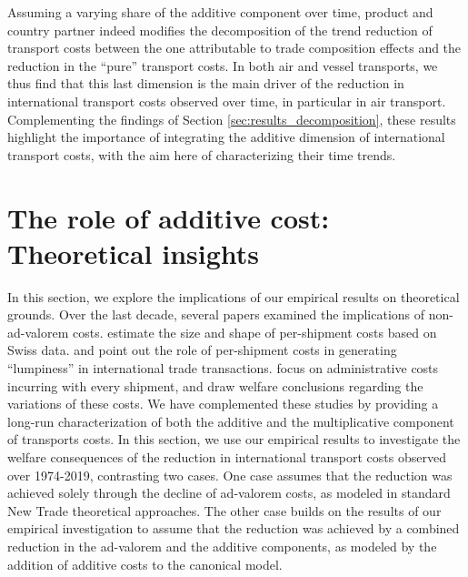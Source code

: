 \documentclass[a4paper,11pt]{article}
\begin{document}
Assuming a varying share of the additive component over time, product and country partner indeed modifies the decomposition of the trend reduction of transport costs between the one attributable to trade composition effects and the reduction in the ``pure'' transport costs.
In both air and vessel transports, we thus find that this last dimension is the main driver of the reduction in international transport costs observed over time, in particular in air transport.
Complementing the findings of Section \ref{sec:results_decomposition}, these results highlight the importance of integrating the additive dimension of international transport costs, with the aim here of characterizing their time trends.

\section{The role of additive cost: Theoretical insights}\label{sec:theory}


In this section, we explore the implications of our empirical results on theoretical grounds. Over the last decade, several papers examined the implications of non-ad-valorem costs. \cite{Kropf-Saure-JIE-2016} estimate the size and shape of per-shipment costs based on Swiss data. \cite{Alessandria-et-al-AER-2010} and \cite{Hornok-et-al-RES-2015} point out the role of per-shipment costs in generating ``lumpiness'' in international trade transactions. \cite{Hornok-et-al-JIE-2015} focus on administrative costs incurring with every shipment, and draw welfare conclusions regarding the variations of these costs. We have complemented these studies by providing a long-run characterization of both the additive and the multiplicative component of transports costs. In this section, we use our empirical results to investigate the welfare consequences of the reduction in international transport costs observed over 1974-2019, contrasting two cases. One case assumes that the reduction was achieved solely through the decline of ad-valorem costs, as modeled in standard New Trade theoretical approaches. The other case builds on the results of our empirical investigation to assume that the reduction was achieved by a combined reduction in the ad-valorem and the additive components, as modeled by the addition of additive costs to the canonical \citet{melitz} model.\smallskip
\end{document}
